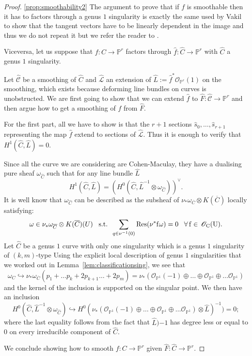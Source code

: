 \documentclass[11pt]{amsart}
\newcommand{\PP}{\mathbb P}
\newcommand{\OO}{\mathcal O}
\renewcommand{\to}{\rightarrow}
\newcommand{\cC}{\mathcal C}
\theoremstyle{plain}
\theoremstyle{definition}
\begin{document}
\begin{proof}\ref{prop:smoothability2}
 The argument to prove that if $f$ is smoothable then it has to factors through a genus $1$ singularity is exactly the same used by Vakil to show that the tangent vectors have to be linearly dependent in the image and thus we do not repeat it but we refer the reader to \cite{Vre}.
 
Viceversa, let us suppose that $f\colon C\to \PP^r$ factors through $\hat{f}\colon \hat{C}\to\PP^r$  with $\hat{C} $ a genus $1$ singularity. 

Let $\hat{\cC}$ be a smoothing of $\hat{C}$ and $\hat{\mathcal L}$ an extension of $\hat{L}:=\hat{f}^*\OO_{\PP^r}(1)$ on the smoothing, which exists because deforming line bundles on curves is unobstructed.
We are first going to show that we can extend $\hat{f}$ to $\hat{F}\colon \hat{\cC}\to\PP^r$ and then argue how to get a smoothing of $f$ from $\hat{F}.$

For the first part, all we have to show is that the $r+1$ sections $\hat{s}_0,\dots, \hat{s}_{r+1}$ representing the map $\hat{f}$ extend to sections of $\hat{\mathcal{L}}.$
Thus it is enough to verify that $H^1(\hat{C},\hat{L})=0.$ 

Since all the curve we are considering are Cohen-Maculay, they have a dualising pure sheaf $\omega_{\hat{C}}$ such that for any line bundle $\hat{L}$
\[H^1(\hat{C},\hat{L})=(H^0(\hat{C},\hat{L}^{-1}\otimes\omega_{\hat{C}}))^{\vee}.\]
It is well know \cite[IV, \S~3]{serre} that  $\omega_{\hat{C}}$ can be described as the subsheaf of $\nu_* \omega_{\overline{C}}\otimes K(\overline{C})$ locally satisfying:
\[\omega\in \nu_* \omega_{\overline{C}}\otimes K(\overline{C})(U)\;\;\;\text{s.t.}\;\;\sum_{q\in \nu^{-1}(0)}\rm{Res}(\nu^*f\omega) =0\;\;\;\forall \,f\in\,\OO_C(U).\]
Let $\hat{C}$ be a genus $1$ curve with only one singularity which is a genus $1$ singularity of $(k,m)$-type
 Using the explicit local description of genus $1$ singularities that we worked out in Lemma~\ref{lem:classificationsing}, we see that 
\[\omega_C\hookrightarrow \nu_*\omega_{\overline{C}}(p_1+\dots p_k+2 p_{k+1}\dots+2p_m)=\nu_*\left(\OO_{\PP^1}(-1)\oplus\dots\oplus\OO_{\PP^1}\oplus\dots \OO_{\PP^1}\right)\]
and the kernel of the inclusion is supported on the singular point. We then have an inclusion
\[H^0(\hat{C},\hat{L}^{-1}\otimes\omega_{\hat{C}})\hookrightarrow H^0(\nu_*\left(\OO_{\PP^1}(-1)\oplus\dots\oplus\OO_{\PP^1}\oplus\dots \OO_{\PP^1}\right)\otimes\hat{L})^{-1})=0;\]
where the last equality follows from the fact that $\hat{L}){-1}$ has degree less or equal to $0$ on every irreducible component of $\hat{C}.$

We conclude showing how to smooth $f\colon C\to \PP^r$ given $\hat{F}\colon\hat{C}\to\PP^r.$



 
  
  \end{proof}
\end{document}
